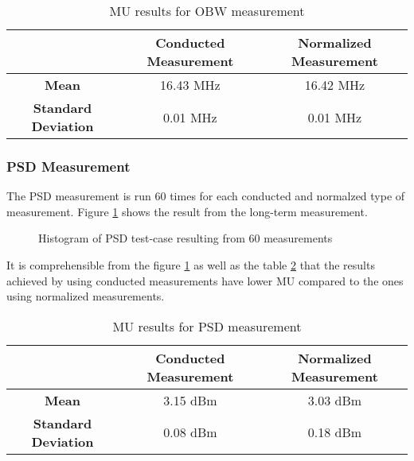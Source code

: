 \begin{table}[H]
  \centering
\begin {tabular} {|c|c|c|} 
\toprule
 & \textbf{Conducted Measurement} & \textbf{Normalized Measurement} \\ 
\midrule 
\textbf{Mean} & 16.43 MHz & 16.42 MHz\\
\textbf{Standard Deviation} & 0.01 MHz & 0.01 MHz\\
\bottomrule
 \end{tabular}
  \caption{\acf{MU} results for \acs{OBW} measurement} \label{tab:tab1}
\end{table}

\subsubsection{\acf{PSD} Measurement}
The \acs{PSD} measurement is run 60 times for each conducted and normalzed type of measurement. Figure
\ref{fig:otavscond2} shows the result from the long-term measurement.
\begin{figure}[H]
\centering
{}
\caption{Histogram of \acs{PSD} test-case resulting from 60 measurements }
\label{fig:otavscond2} 
\end{figure}
It is comprehensible from the figure \ref{fig:otavscond2} as well as the table \ref{tab:tab2} that the results achieved by using conducted measurements have lower \acs{MU} compared to the ones using normalized measurements.
\begin{table}[H]
  \centering
\begin {tabular} {|c|c|c|} 
\toprule
 & \textbf{Conducted Measurement} & \textbf{Normalized Measurement} \\ 
\midrule 
\textbf{Mean} & 3.15 dBm & 3.03 dBm\\
\textbf{Standard Deviation} & 0.08 dBm & 0.18 dBm\\
\bottomrule
 \end{tabular}
  \caption{\acf{MU} results for \acs{PSD} measurement} \label{tab:tab2}
\end{table}


